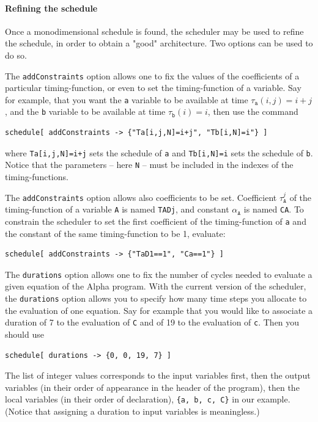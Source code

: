\documentclass[12pt]{article}
\newcommand{\Alpha}{{\sc Alpha}}
\newcommand{\alfa}{\Alpha}
\begin{document}
\paragraph*{Refining the schedule}
Once a monodimensional schedule is found, the scheduler
may be used to refine the schedule, in order to obtain 
a "good" architecture. Two options can be used to do so.

The \texttt{addConstraints} option allows one to fix the
values of the coefficients of a particular timing-function, or
even to set the timing-function of a variable. Say for example, 
that you want the \texttt{a} variable to be available 
at time $\tau_{\texttt{a}}(i,j) = i + j$, and the \texttt{b}
variable to be available at time $\tau_{\texttt{b}}(i) = i$, 
then use the command
\begin{verbatim}
schedule[ addConstraints -> {"Ta[i,j,N]=i+j", "Tb[i,N]=i"} ]
\end{verbatim}
where \texttt{Ta[i,j,N]=i+j} sets the schedule of \texttt{a}
and \texttt{Tb[i,N]=i} sets the schedule of \texttt{b}. Notice
that the parameters -- here \texttt{N} -- must be included in the indexes of the 
timing-functions. 

The \texttt{addConstraints} option allows also coefficients
to be set. Coefficient
$\tau^j_{{\texttt{A}}}$ of the timing-function of a 
variable \texttt{A} is named \texttt{TADj}, and constant 
$\alpha_{\texttt{A}}$ is named \texttt{CA}. 
To constrain the scheduler to set the first coefficient of the
timing-function of \texttt{a} and the constant of the 
same timing-function to be 1, evaluate: 
\begin{verbatim}
schedule[ addConstraints -> {"TaD1==1", "Ca==1"} ]
\end{verbatim}

The \texttt{durations} option allows one to fix the number
of cycles needed to evaluate a given equation of the 
\alfa{} program. With the current version of the scheduler, 
the \texttt{durations} option allows you to specify how
many time steps you allocate to the evaluation of one 
equation. Say for example that you would like to associate 
a duration of 7 to the evaluation of \texttt{C} and of
19 to the evaluation of \texttt{c}. Then you should
use
\begin{verbatim}
schedule[ durations -> {0, 0, 19, 7} ]
\end{verbatim}
The list of integer values corresponds to the input variables
first, then the output variables (in their order of appearance
in the header of the program), then the local variables (in their
order of declaration), \texttt{\{a, b, c, C\}} in 
our example. (Notice that assigning a duration to input variables
is meaningless.)
\end{document}

